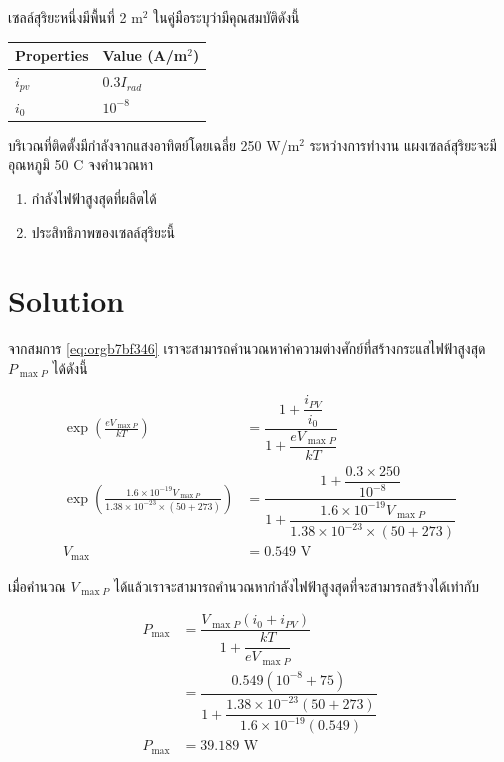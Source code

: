 \documentclass[a4paper,nobib,openany,10pt]{tufte-book}
\begin{document}
เซลล์สุริยะหนึ่งมีพื้นที่ 2 m\(^{\text{2}}\)
ในคู่มือระบุว่ามีคุณสมบัติดังนี้

\begin{center}
\begin{tabular}{ll}
\toprule
Properties & Value (A/m\(^{\text{2}}\))\\
\midrule
\(i_{pv}\) & \(0.3 I_{rad}\)\\
\(i_0\) & \(10^{-8}\)\\
\bottomrule
\end{tabular}
\end{center}

บริเวณที่ติดตั้งมีกำลังจากแสงอาทิตย์โดยเฉลี่ย 250 W/m\(^2\)
ระหว่างการทำงาน แผงเซลล์สุริยะจะมีอุณหภูมิ 50 C จงคำนวณหา

\begin{enumerate}
\item กำลังไฟฟ้าสูงสุดที่ผลิตได้

\item ประสิทธิภาพของเซลล์สุริยะนี้
\end{enumerate}

\section{Solution}
\label{sec:org697e20e}
จากสมการ \ref{eq:orgb7bf346} เราจะสามารถคำนวณหาค่าความต่างศักย์ที่สร้างกระแสไฟฟ้าสูงสุด
\(P_{\max P}\) ได้ดังนี้

\begin{align*}
  \exp \left(\frac{e V_{\max P}}{kT} \right) &= \dfrac{1+\dfrac{i_{PV}}{i_0}}{1+ \dfrac{e V_{\max P}}{kT}} \\
  \exp \left(\frac{ 1.6 \times 10^{-19} V_{\max P} }{ 1.38 \times 10^{-23} \times (50 + 273)} \right) &= \dfrac{1+ \dfrac{0.3 \times 250}{10^{-8}}}{1+\dfrac{1.6 \times 10^{-19} V_{\max P}}{1.38 \times 10^{-23} \times (50 + 273)}} \\
  V_{\max} &= 0.549 \text{ V}
\end{align*}

เมื่อคำนวณ \(V_{\max P}\)
ได้แล้วเราจะสามารถคำนวณหากำลังไฟฟ้าสูงสุดที่จะสามารถสร้างได้เท่ากับ

\[\begin{aligned}
    P_{\max} &=  \dfrac{V_{\max P} ( i_0 + i_{PV} )}{1 + \dfrac{kT}{e V_{\max P}}} \\
             &= \dfrac{0.549 \left(10^{-8} + 75\right)}{1 + \dfrac{ 1.38 \times 10^{-23} (50 + 273)}{1.6 \times 10^{-19} (0.549)}} \\
             P_{\max} &= 39.189 \text{ W}
  \end{aligned}\]
\end{document}
